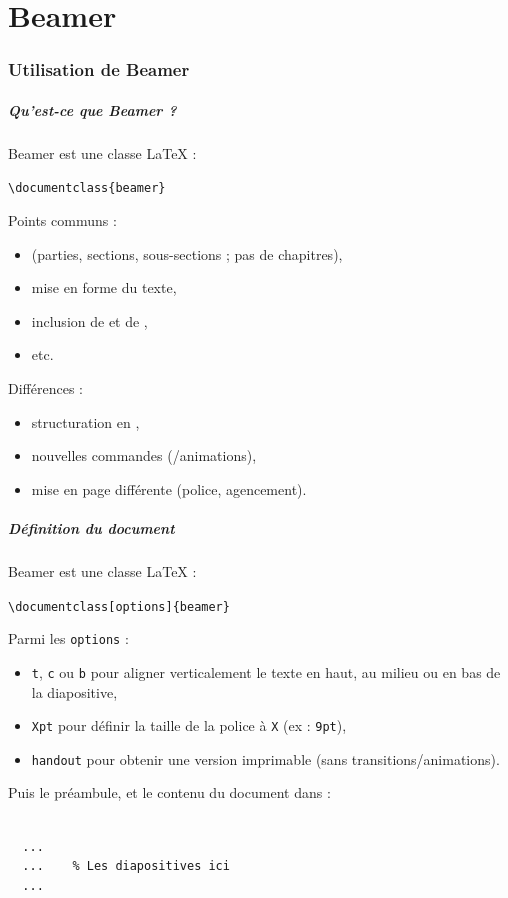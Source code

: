 
\part{Beamer}

\section{Utilisation de Beamer}

\begin{frame}[fragile]
  \frametitle{Qu'est-ce que Beamer ?}

Beamer est une classe \LaTeX{} :

\lstinline?\documentclass{beamer}?

\medskip
Points communs :
\begin{itemize}
  \item {} (parties, sections, sous-sections ; pas de chapitres),
  \item mise en forme du texte,
  \item inclusion de  et de ,
  \item etc.
\end{itemize}

\medskip
Différences :
\begin{itemize}
  \item structuration en ,
  \item nouvelles commandes (/animations),
  \item mise en page différente (police, agencement).
\end{itemize}
\end{frame}



\begin{frame}[fragile]
  \frametitle{Définition du document}

Beamer est une classe \LaTeX{} :

\lstinline?\documentclass[options]{beamer}?

\medskip
Parmi les \lstinline?options? :
\begin{itemize}
  \item \lstinline?t?, \lstinline?c? ou \lstinline?b? pour aligner verticalement le texte en haut, au milieu ou en bas de la diapositive,
  \item \lstinline?Xpt? pour définir la taille de la police à \lstinline?X? (ex : \lstinline?9pt?),
  \item \lstinline?handout? pour obtenir une version imprimable (sans transitions/animations).
\end{itemize}

\medskip
Puis le préambule, et le contenu du document dans :
\begin{lstlisting}

  ...
  ...    % Les diapositives ici
  ...

\end{lstlisting}
\end{frame}



